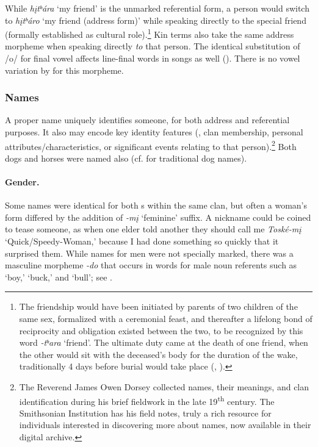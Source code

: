 \documentclass[output=paper]{LSP/langsci}
\begin{document}
While \textit{h\k{i}tʰára} `my friend' is the unmarked referential form, a person would switch to \textit{h\k{i}tʰáro} `my friend (address form)' while speaking directly to the special friend (formally established as cultural role).\footnote{The friendship would have been initiated by parents of two children of the same sex, formalized with a ceremonial feast, and thereafter a lifelong bond of reciprocity and obligation existed between the two, to be recognized by this word \textit{-tʰara} `friend'. The ultimate duty came at the death of one friend, when the other would sit with the deceased's body for the duration of the wake, traditionally 4 days before burial would take place (\citealt{Whitman1936}, \citealt{Davidson1997}).}  Kin terms also take the same address morpheme when speaking directly \textit{to} that person. The identical substitution of /o/ for  final vowel affects line-final words in songs as well (\citealt{Davidson1997}).  There is no vowel variation by  for this morpheme.         
  
\subsubsection{Names} 
A proper name uniquely identifies someone, for both address and referential purposes. It also may encode key identity features (, clan membership, personal attributes/characteristics, or significant events relating to that person).\footnote{The Reverend James Owen Dorsey collected names, their meanings, and clan identification during his brief fieldwork in the late 19\textsuperscript{th} century. The Smithsonian Institution has his field notes, truly a rich resource for individuals interested in discovering more about names, now available in their digital archive.}  Both dogs and horses were named also (cf. \citealt{Whitman1936} for traditional  dog names).  


\paragraph*{Gender.} Some names were identical for both s within the same clan, but often a woman's form differed by the addition of \textit{-m\k{i}} `feminine' suffix.  A nickname could be coined to tease someone, as when one elder told another they should call me \textit{Toské-m\k{i}} `Quick/Speedy-Woman,' because I had done something so quickly that it surprised them. While names for men were not specially marked, there was a masculine morpheme \textit{-do} that occurs in words for male noun referents such as `boy,' `buck,' and `bull'; see .  
\end{document}
